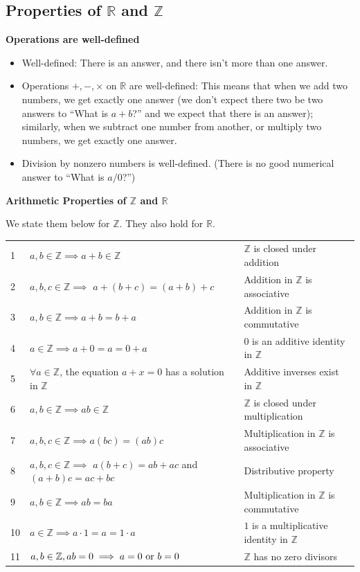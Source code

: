 \documentclass[11pt]{article}
\newcommand\tn{\textnormal}
\newcommand{\R}{\mathbb{R}}
\newcommand{\Z}{\mathbb{Z}}
\theoremstyle{definition}
\begin{document}
\newpage
\subsection{Properties of $\R$ and $\Z$} \label{s: properties of R and Z}

{\bf Operations are well-defined}
\vspace*{-4pt}
\begin{itemize}
\item[] Well-defined: There is an answer, and there isn't more than one answer.

\item[] Operations $+, -, \times$ on $\R$ are well-defined: This means that when we add two numbers, we get exactly one answer (we don't expect there two be two answers to ``What is $a+b$?'' and we expect that there is an answer); similarly, when we subtract one number from another, or multiply two numbers, we get exactly one answer.

\item[] Division by nonzero numbers is well-defined. (There is no good numerical answer to ``What is $a/0$?'')
\end{itemize}

{\bf Arithmetic Properties of $\Z$ and $\R$}

We state them below for $\Z$. They also hold for $\R$.

\begin{tabular}{C{0.2in}|L{3.5in}|L{2.25in}}
1 & $a,b \in \Z \implies a+b\in \Z$ &  $\Z$ is closed under addition \\ 
2 & $a,b,c\in \Z\implies$ $a+(b+c)=(a+b)+c$ & Addition in $\Z$ is associative \\
3 & $a,b \in \Z \implies a+b=b+a$&  Addition in $\Z$ is commutative \\ 
4 & $a\in \Z \implies a+0=a=0+a$ & $0$ is an additive identity in $\Z$ \\ 
5 & $\forall a\in \Z$, the equation $a+x=0$ has a solution in $\Z$ & Additive inverses exist in $\Z$ \\ 
6 & $a,b\in\Z \implies ab\in \Z$ & $\Z$ is closed under multiplication \\ 
7 & $a,b,c\in \Z \implies a(bc)=(ab)c$ & Multiplication in $\Z$ is associative \\ 
8 & $a,b,c\in \Z\implies$  $a(b+c)=ab+ac$ and $(a+b)c=ac+bc$& Distributive property \\
9 & $a,b\in \Z\implies ab=ba$ & Multiplication in $\Z$ is commutative \\  
10 &$a\in\Z\implies a\cdot 1=a=1\cdot a$ & $1$ is a multiplicative identity in $\Z$ \\ 
11 & $a,b\in \Z, ab=0 \implies a=0 \tn { or } b=0$ & $\Z$ has no zero divisors
\end{tabular} 
\end{document}
